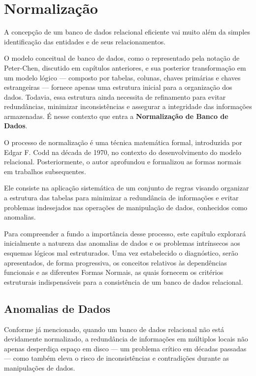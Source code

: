 \chapter{Normalização}
\label{cap:normalizacao}

A concepção de um banco de dados relacional eficiente vai muito além da simples identificação das entidades e de seus relacionamentos.

O modelo conceitual de banco de dados, como o representado pela notação de Peter-Chen, discutido em capítulos anteriores, e sua posterior transformação em um modelo lógico — composto por tabelas, colunas, chaves primárias e chaves estrangeiras — fornece apenas uma estrutura inicial para a organização dos dados. Todavia, essa estrutura ainda necessita de refinamento para evitar redundâncias, minimizar inconsistências e assegurar a integridade das informações armazenadas.\cite{ramakrishnan2011} É nesse contexto que entra a \textbf{Normalização de Banco de Dados}.

O processo de normalização é uma técnica matemática formal, introduzida por Edgar F. Codd na década de 1970, no contexto do desenvolvimento do modelo relacional.\cite{codd1970relational} Posteriormente, o autor aprofundou e formalizou as formas normais em trabalhos subsequentes.\cite{codd1971normalization}

Ele consiste na aplicação sistemática de um conjunto de regras visando organizar a estrutura das tabelas para minimizar a redundância de informações e evitar problemas indesejados nas operações de manipulação de dados, conhecidos como anomalias. 

Para compreender a fundo a importância desse processo, este capítulo explorará inicialmente a natureza das anomalias de dados e os problemas intrínsecos aos esquemas lógicos mal estruturados. Uma vez estabelecido o diagnóstico, serão apresentados, de forma progressiva, os conceitos relativos às dependências funcionais e as diferentes Formas Normais, as quais fornecem os critérios estruturais indispensáveis para a consistência de um banco de dados relacional.

\section{Anomalias de Dados}
Conforme já mencionado, quando um banco de dados relacional não está devidamente normalizado, a redundância de informações em múltiplos locais não apenas desperdiça espaço em disco — um problema crítico em décadas passadas — como também eleva o risco de inconsistências e contradições durante as manipulações de dados. 

